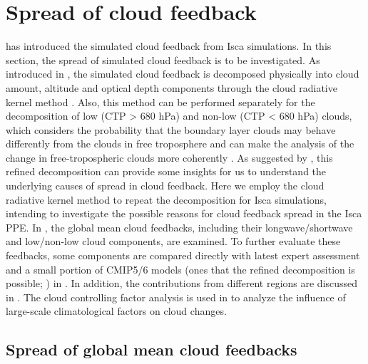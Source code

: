 
\section{Spread of cloud feedback}
\label{sec:spread_of_cld_fbk_in_PPE}

 has introduced the simulated cloud feedback from Isca simulations. In this section, the spread of simulated cloud feedback is to be investigated. As introduced in , the simulated cloud feedback is decomposed physically into cloud amount, altitude and optical depth components through the cloud radiative kernel method \citep{Zelinka2012computing1,Zelinka2012computing2}. Also, this method can be performed separately for the decomposition of low (CTP > 680 hPa) and non-low (CTP < 680 hPa) clouds, which considers the probability that the boundary layer clouds may behave differently from the clouds in free troposphere and can make the analysis of the change in free-tropospheric clouds more coherently \citep{Zelinka2016insights}. As suggested by \cite{Zelinka2016insights}, this refined decomposition can provide some insights for us to understand the underlying causes of spread in cloud feedback. Here we employ the cloud radiative kernel method to repeat the decomposition for Isca simulations, intending to investigate the possible reasons for cloud feedback spread in the Isca PPE. In , the global mean cloud feedbacks, including their longwave/shortwave and low/non-low cloud components, are examined. To further evaluate these feedbacks, some components are compared directly with latest expert assessment \citep{Sherwood2020} and a small portion of CMIP5/6 models (ones that the refined decomposition is possible; \citealt{Zelinka2012climate}) in . In addition, the contributions from different regions are discussed in . The cloud controlling factor analysis is used in  to analyze the influence of large-scale climatological factors on cloud changes.

\subsection{Spread of global mean cloud feedbacks}
\label{sec:spread_of_gm_cld_fbks_PPE}

